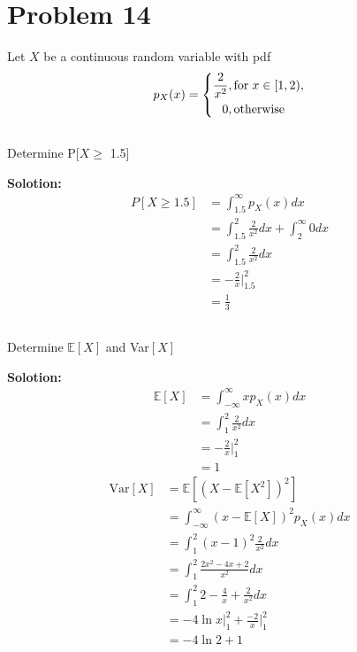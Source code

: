 \documentclass[a4paper,11pt,reqno]{amsart}
\begin{document}
\section{Problem 14}
Let $X$ be a continuous random variable with pdf
$$ p_X(x)=\left\{
\begin{aligned}
\frac{2}{x^2}&,\text{for} \hspace{0.3em} x \in [1,2), \\
0&,   \text{otherwise} 
\end{aligned}
\right.
$$
\subsection{}
Determine P$[X \geq$ 1.5]

\textbf{Solotion:}
$$
\begin{aligned}
P[X \geq 1.5]&=\int_{1.5}^{\infty} p_X(x) dx
\\
&=\int_{1.5}^{2} \frac{2}{x^2} dx + \int_{2}^{\infty} 0 dx
\\
&=\int_{1.5}^{2} \frac{2}{x^2} dx
\\
&=-\frac{2}{x}\bigg|_{1.5}^2
\\
&=\frac{1}{3}
\end{aligned}
$$

\subsection{}
Determine $\mathbb{E}[X]$ and Var$[X]$

\textbf{Solotion:}
$$
\begin{aligned}
    \mathbb{E}[X]&=\int_{-\infty}^{\infty} xp_X(x) dx
    \\
    &=\int_{1}^{2} \frac{2}{x^2} dx
    \\
    &=-\frac{2}{x}\bigg|_{1}^2
    \\
    &=1
\end{aligned}
$$
\vspace{1em}
$$
\begin{aligned}
    \text{Var}[X]&=\mathbb{E}[(X-\mathbb{E}[X^2])^2]
    \\
    &=\int_{-\infty}^{\infty} (x-\mathbb{E}[X])^2p_X(x) dx
    \\
    &=\int_{1}^{2} (x-1)^2\frac{2}{x^2} dx
    \\
    &=\int_{1}^{2} \frac{2x^2-4x+2}{x^2} dx
    \\
    &=\int_{1}^{2} 2-\frac{4}{x}+\frac{2}{x^2} dx
    \\
    &=-4\ln x\bigg|^2_1+\frac{-2}{x}\bigg|^2_1
    \\
    &=-4\ln2+1
\end{aligned}
$$
\end{document}

